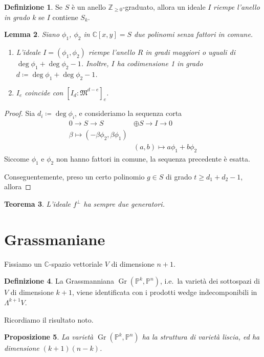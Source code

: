 \documentclass[a4paper, 11pt]{article}
\theoremstyle{definition}
\newtheorem{Def}{Definizione}[section]
\theoremstyle{plain}
\newtheorem{Lemma}[Def]{Lemma}
\newtheorem{Prop}[Def]{Proposizione}
\newtheorem{Teo}[Def]{Teorema}
\newcommand{\PP}{\mathbb{P}}
\newcommand{\C}{\mathbb{C}}
\newcommand{\Z}{\mathbb{Z}}
\newcommand{\MM}{\mathfrak{M}}
\newcommand{\deff}{\coloneqq}
\DeclareMathOperator{\Gr}{Gr}
\begin{document}
\begin{Def}
		Se $S$ è un anello $\Z_{\ge 0}$-graduato, allora un ideale $I$ \emph{riempe l'anello in grado $k$} se $I$ contiene $S_k$.
\end{Def}
\begin{Lemma}
	Siano $\phi_1$, $\phi_2$ in $\C[x,y] = S$ due polinomi senza fattori in comune.
	\begin{enumerate}
		\item L'ideale $I = (\phi_1, \phi_2)$ riempe l'anello $R$ in gradi maggiori o uguali di $\deg \phi_1 + \deg \phi_2 - 1$. Inoltre, $I$ ha codimensione 1 in grado $d \deff \deg \phi_1 + \deg \phi_2 -1 $.
		\item  $I_e$ coincide con $[I_d \colon \MM^{d-e}]_e$.
	\end{enumerate}
\end{Lemma}
\begin{proof}
	Sia $d_i \deff \deg \phi_i$, e consideriamo la sequenza corta
	\[
	\begin{split}
		0 \to S \to S &\oplus S \to I \to 0\\
		\beta \mapsto (-\beta\phi_2, \beta\phi_1)\\
		&(a,b) \mapsto a\phi_1 + b\phi_2
	\end{split}
	\]
	Siccome $\phi_1$ e $\phi_2$ non hanno fattori in comune, la sequenza precedente è esatta.
	
	Conseguentemente, preso un certo polinomio $g \in S$ di grado $t \ge d_1 + d_2 -1$, allora 
\end{proof}

\begin{Teo}
	L'ideale $f^\bot$ ha sempre due generatori.	
\end{Teo}

\section{Grassmaniane}
Fissiamo un $\C$-spazio vettoriale $V$ di dimensione $n+1$.
\begin{Def}
	La Grassmanniana $\Gr(\PP^k, \PP^n)$, i.e.\ la varietà dei sottospazi di $V$ di dimensione $k+1$, viene identificata con i prodotti wedge indecomponibili in $\Lambda^{k+1} V$.
\end{Def}
Ricordiamo il risultato noto.
\begin{Prop}
	La varietà $\Gr(\PP^k, \PP^n)$ ha la struttura di varietà liscia, ed ha dimensione $(k+1)(n-k)$.
\end{Prop}
\end{document}
